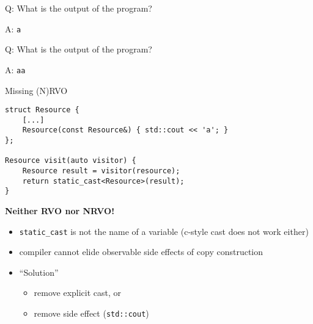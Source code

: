 \begin{frame}
    \centering
    \scalebox{5.}{\color{vertexDarkRed}$*$}
\end{frame}

\begin{frame}[fragile]{Q: What is the output of the program?}
\end{frame}

\addtocounter{framenumber}{-1}
\begin{frame}[fragile]{A: \texttt{a}}
\end{frame}

\begin{frame}[fragile]{Q: What is the output of the program?}
\end{frame}

\addtocounter{framenumber}{-1}
\begin{frame}[fragile]{A: \texttt{aa}}
\end{frame}

\begin{frame}[fragile]{Missing (N)RVO}
    \begin{lstlisting}
struct Resource {
    [...]
    Resource(const Resource&) { std::cout << 'a'; }
};

Resource visit(auto visitor) {
    Resource result = visitor(resource);
    return static_cast<Resource>(result);
}
    \end{lstlisting}

    \textbf{Neither RVO nor NRVO!}
    \begin{itemize}
        \item \texttt{static\_cast} is not the name of a variable (c-style cast does not work either)
        \item compiler cannot elide observable side effects of copy construction
        \item \enquote{Solution}
        \begin{itemize}
            \item remove explicit cast, or
            \item remove side effect (\texttt{std::cout})
        \end{itemize}
    \end{itemize}
\end{frame}

